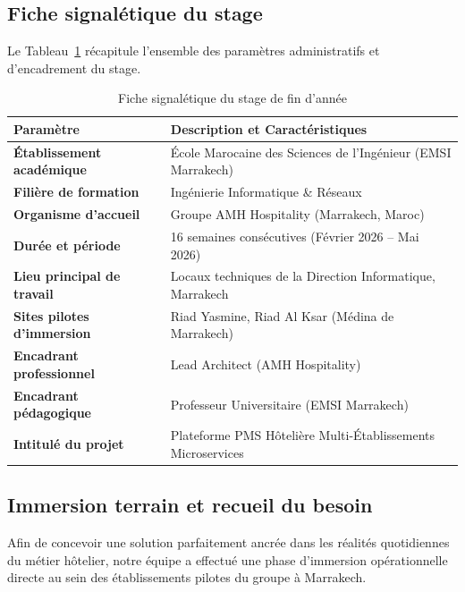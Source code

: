 \documentclass[12pt,a4paper,oneside]{report}
\begin{document}
\subsection{Fiche signalétique du stage}

Le Tableau~\ref{tab:fiche_stage} récapitule l'ensemble des paramètres administratifs et d'encadrement du stage.

\begin{table}[H]
\centering
\small
\renewcommand{\arraystretch}{1.3}
\begin{tabularx}{\textwidth}{|p{4.5cm}|X|}
\hline
\textbf{Paramètre} & \textbf{Description et Caractéristiques} \\
\hline
\textbf{Établissement académique} & École Marocaine des Sciences de l'Ingénieur (EMSI Marrakech) \\
\hline
\textbf{Filière de formation} & Ingénierie Informatique \& Réseaux \\
\hline
\textbf{Organisme d'accueil} & Groupe AMH Hospitality (Marrakech, Maroc) \\
\hline
\textbf{Durée et période} & 16 semaines consécutives (Février 2026 -- Mai 2026) \\
\hline
\textbf{Lieu principal de travail} & Locaux techniques de la Direction Informatique, Marrakech \\
\hline
\textbf{Sites pilotes d'immersion} & Riad Yasmine, Riad Al Ksar (Médina de Marrakech) \\
\hline
\textbf{Encadrant professionnel} & Lead Architect (AMH Hospitality) \\
\hline
\textbf{Encadrant pédagogique} & Professeur Universitaire (EMSI Marrakech) \\
\hline
\textbf{Intitulé du projet} & Plateforme PMS Hôtelière Multi-Établissements Microservices \\
\hline
\end{tabularx}
\caption{Fiche signalétique du stage de fin d'année}
\label{tab:fiche_stage}
\end{table}

\subsection{Immersion terrain et recueil du besoin}

Afin de concevoir une solution parfaitement ancrée dans les réalités quotidiennes du métier hôtelier, notre équipe a effectué une phase d'immersion opérationnelle directe au sein des établissements pilotes du groupe à Marrakech.
\end{document}

